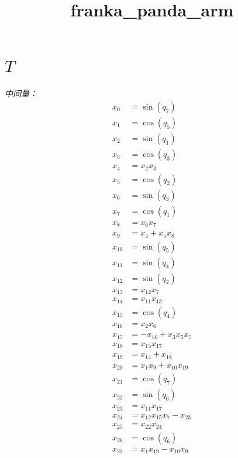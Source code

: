 \documentclass[11pt]{article}
\title{franka\_panda\_arm}
\date{}
\begin{document}
\maketitle


\section*{$T$}

\textit{中间量：}
\begin{align*}
x_{0} &= \sin{\left(q_{7} \right)} \\
x_{1} &= \cos{\left(q_{5} \right)} \\
x_{2} &= \sin{\left(q_{1} \right)} \\
x_{3} &= \cos{\left(q_{3} \right)} \\
x_{4} &= x_{2} x_{3} \\
x_{5} &= \cos{\left(q_{2} \right)} \\
x_{6} &= \sin{\left(q_{3} \right)} \\
x_{7} &= \cos{\left(q_{1} \right)} \\
x_{8} &= x_{6} x_{7} \\
x_{9} &= x_{4} + x_{5} x_{8} \\
x_{10} &= \sin{\left(q_{5} \right)} \\
x_{11} &= \sin{\left(q_{4} \right)} \\
x_{12} &= \sin{\left(q_{2} \right)} \\
x_{13} &= x_{12} x_{7} \\
x_{14} &= x_{11} x_{13} \\
x_{15} &= \cos{\left(q_{4} \right)} \\
x_{16} &= x_{2} x_{6} \\
x_{17} &= - x_{16} + x_{3} x_{5} x_{7} \\
x_{18} &= x_{15} x_{17} \\
x_{19} &= x_{14} + x_{18} \\
x_{20} &= x_{1} x_{9} + x_{10} x_{19} \\
x_{21} &= \cos{\left(q_{7} \right)} \\
x_{22} &= \sin{\left(q_{6} \right)} \\
x_{23} &= x_{11} x_{17} \\
x_{24} &= x_{12} x_{15} x_{7} - x_{23} \\
x_{25} &= x_{22} x_{24} \\
x_{26} &= \cos{\left(q_{6} \right)} \\
x_{27} &= x_{1} x_{19} - x_{10} x_{9} \\

\end{align*}
\end{document}
